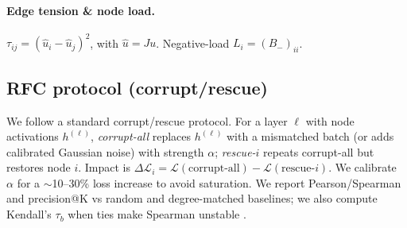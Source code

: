 \documentclass[11pt]{article}
\newcommand{\1}{\mathbf{1}}
\newif\ifshowanchors
\begin{document}
\paragraph{Edge tension \& node load.}
$\tau_{ij}=(\hat u_i-\hat u_j)^2$, with $\hat u=Ju$. Negative-load $L_i=(B_-)_{ii}$.

\subsection*{RFC protocol (corrupt/rescue)}\label{app:rfc-protocol}
We follow a standard corrupt/rescue protocol. For a layer $\ell$ with node activations $h^{(\ell)}$, \emph{corrupt-all} replaces $h^{(\ell)}$ with a mismatched batch (or adds calibrated Gaussian noise) with strength $\alpha$; \emph{rescue-$i$} repeats corrupt-all but restores node $i$. Impact is $\Delta\mathcal{L}_i=\mathcal{L}(\text{corrupt-all})-\mathcal{L}(\text{rescue-}i)$. We calibrate $\alpha$ for a $\sim$10--30\% loss increase to avoid saturation. We report Pearson/Spearman and precision@K vs random and degree-matched baselines; we also compute Kendall's $\tau_b$ when ties make Spearman unstable \citep{Kendall1938,Spearman1904}.

\ifshowanchors
\section{Figure anchors}\label{app:figs}
\begin{itemize}[leftmargin=1.25em]
\item \textbf{Curves:} \path{figs/curve_facebook_opt-125m_residual.png}, \path{figs/curve_facebook_opt-125m_heads.png};\\
\path{figs/curve_EleutherAI_gpt-neo-125M_residual.png}, \path{figs/curve_EleutherAI_gpt-neo-125M_heads.png};\\
\path{figs/curve_distilgpt2_residual.png}, \path{figs/curve_distilgpt2_heads.png}.
\item \textbf{Edge attribution:} \path{figs/edge_attr_*}, \path{figs/edge_attr_props_*}.
\item \textbf{Mass panels:} \path{figs/mass_removal_facebook_opt-125m_residual.png}, \path{figs/mass_removal_facebook_opt-125m_heads.png}; \path{figs/mass_panel_EleutherAI_gpt-neo-125M_residual.png}, \path{figs/mass_panel_EleutherAI_gpt-neo-125M_heads.png}; \path{figs/mass_panel_distilgpt2_heads.png}.
\item \textbf{Spectra overlays:} \path{figs/spectrum_overlay_*}.
\item \textbf{Controls (seed0):} \path{figs/control_convex_vs_edge_mix_facebook_opt-125m_residual_seed0.png}, \texttt{...gpt-neo-125M...}, \texttt{...distilgpt2...}.\\
\textit{(Seeds 0--2 available analogously.)}
\end{itemize}
\fi
\end{document}
